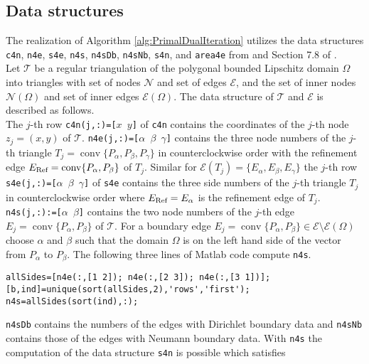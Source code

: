 \subsection{Data structures }
The realization of Algorithm \ref{alg:PrimalDualIteration} utilizes the data
structures \texttt{c4n}, 
\texttt{n4e}, \texttt{s4e}, \texttt{n4s}, \texttt{n4sDb}, \texttt{n4sNb}, \texttt{s4n},
and \texttt{area4e}
from \cite{Carstensen2017script} and Section 7.8 of \cite{CarstensenBrennerFEM}.\\
Let $\mathcal{T}$ be a regular triangulation of the polygonal bounded
Lipschitz domain $\Omega$ into triangles with set of nodes $\mathcal{N}$ and
set of edges
$\mathcal{E}$, and the set of inner nodes $\mathcal{N}(\Omega)$ and set of inner edges
$\mathcal{E}(\Omega)$. The data structure of $\mathcal T$ and $\mathcal E$ is described
as follows.\\
The $j$-th row \texttt{c4n(j,:)=[$x$ $y$]} of \texttt{c4n} contains the
coordinates of the $j$-th 
node $z_j=(x,y)$  
of $\mathcal T$.
\texttt{n4e(j,:)=[$\alpha$ $\beta$ $\gamma$]} contains
the three node numbers of the $j$-th triangle 
$T_j=\operatorname{conv}\{P_\alpha,P_\beta,P_\gamma\}$
in counterclockwise order with the refinement edge
$E_\textup{Ref}=\operatorname{conv}
\{P_\alpha,P_\beta\}$
of
$T_j$.
Similar  for
$\mathcal E(T_j) = \{ E_\alpha,E_\beta,E_\gamma\}$
the $j$-th row 
\texttt{s4e(j,:)=[$\alpha$ $\beta$ $\gamma$]} 
of \texttt{s4e}
contains
the three side numbers of the $j$-th triangle $T_j$
in counterclockwise order 
where
$E_\textup{Ref}=E_\alpha$
is the refinement edge of
$T_j$. 
\texttt{n4s(j,:):=[$\alpha$ $\beta$]} contains
the two node numbers of the \(j\)-th edge 
$E_j = \operatorname*{conv} \{ P_\alpha, P_\beta \}$
of $\mathcal T$.
For a boundary edge
\(E_j = \operatorname*{conv} \{ P_\alpha, P_\beta \}\in\mathcal{E}\setminus\mathcal{E}(\Omega)\)
choose $\alpha$ and $\beta$ such that the domain \(\Omega\) is on the left hand side
of the vector from \(P_\alpha\) to \(P_\beta\).
The following three lines of Matlab code compute \texttt{n4s}.
\begin{lstlisting}[frame=single,numbers=none]
allSides=[n4e(:,[1 2]); n4e(:,[2 3]); n4e(:,[3 1])];
[b,ind]=unique(sort(allSides,2),'rows','first');
n4s=allSides(sort(ind),:);
\end{lstlisting}
\texttt{n4sDb} contains the numbers of the edges with Dirichlet boundary data and 
\texttt{n4sNb} contains those of the edges with Neumann boundary data.
With \texttt{n4s} the computation of the data
structure \texttt{s4n} is possible which satisfies
